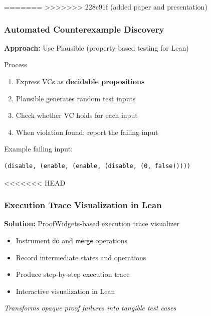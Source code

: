 \documentclass[usepdftitle=false]{beamer}
\newcommand{\F}[1]{\mathsf{#1}}
\begin{document}
=======
>>>>>>> 228c91f (added paper and presentation)
\begin{frame}[fragile]
  \frametitle{Automated Counterexample Discovery}
  
  \textbf{Approach:} Use Plausible (property-based testing for Lean)
  
  \begin{block}{Process}
    \begin{enumerate}
      \item Express VCs as \textbf{decidable propositions}
      \item Plausible generates random test inputs
      \item Check whether VC holds for each input
      \item When violation found: report the failing input
    \end{enumerate}
  \end{block}
  
  \vspace{0.3cm}
  Example failing input:
  \begin{lstlisting}[style=leanstyle]
(disable, (enable, (enable, (disable, (0, false)))))
  \end{lstlisting}
\end{frame}

\begin{frame}
<<<<<<< HEAD
  \frametitle{Execution Trace Visualization in Lean}
  
  
  \vspace{0.3cm}
  \textbf{Solution:} ProofWidgets-based execution trace visualizer
  
  \begin{itemize}
    \item Instrument $\F{do}$ and $\F{merge}$ operations
    \item Record intermediate states and operations
    \item Produce step-by-step execution trace
    \item Interactive visualization in Lean
  \end{itemize}
  
  \vspace{0.2cm}
  \textit{Transforms opaque proof failures into tangible test cases}
\end{frame}
\end{document}

